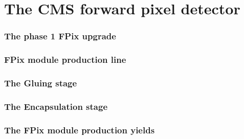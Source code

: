 \chapter{The CMS forward pixel detector}


\subsection{The phase 1 FPix upgrade }


\subsection{FPix module production line}





\subsection{The Gluing stage}



\subsection{The Encapsulation stage}


\subsection{The FPix module production yields}

